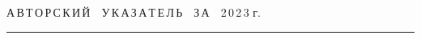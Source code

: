 




\def\stat{cont}


{%




\raggedleft\Large \bf%


А\,В\,Т\,О\,Р\,С\,К\,И\,Й\ \ У\,К\,А\,З\,А\,Т\,Е\,Л\,Ь\ \ З\,А\ \ 2\,0\,2\,3 г. \vskip 17pt


 \hrule


 \par


 }







\label{st\stat}

















\def\leftkol{\ } %


\def\rightkol{\ } %






















\def\leftfootline{\small{\textbf{\thepage}


\hfill СИСТЕМЫ И СРЕДСТВА ИНФОРМАТИКИ\ \ \ выпуск~33\ \ \ №~4\ \ \ 2023}


}%


 \def\rightfootline{\small{СИСТЕМЫ И СРЕДСТВА ИНФОРМАТИКИ\ \ \ выпуск~33\ \ \


№~4\ \ \ 2023


 \hfill \textbf{\thepage}}}





